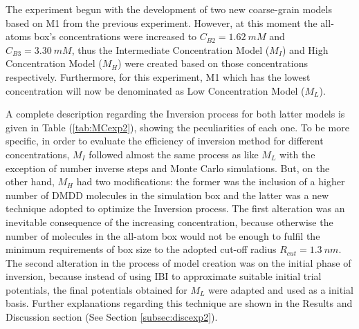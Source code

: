 \documentclass[10pt,a4paper,twoside]{article}
\begin{document}
 The experiment begun with the development of two new coarse-grain models based on M1 from the previous experiment. However, at this moment the all-atoms box's concentrations were increased to $C_{B2} = 1.62\ mM$ and $C_{B3} = 3.30\ mM$, thus the Intermediate Concentration Model ($M_{I}$) and High Concentration Model ($M_{H}$) were created based on those concentrations respectively. Furthermore, for this experiment, M1 which has the lowest concentration will now be denominated as Low Concentration Model ($M_{L}$).
 
  A complete description regarding the Inversion process for both latter models is given in Table (\ref{tab:MCexp2}), showing the peculiarities of each one. To be more specific, in order to evaluate the efficiency of inversion method for different concentrations, $M_{I}$ followed almost the same process as like $M_{L}$ with the exception of number inverse steps and Monte Carlo simulations. But, on the other hand, $M_{H}$ had two modifications: the former was the inclusion of a higher number of DMDD molecules in the simulation box and the latter was a new technique adopted to optimize the Inversion process. The first alteration was an inevitable consequence of the increasing  concentration, because otherwise the number of molecules in the all-atom box would not be enough to fulfil the minimum requirements of box size to the adopted cut-off radius $R_{cut} = 1.3 \ nm$. The second alteration in the process of model creation was on the initial phase of inversion, because instead of using IBI to approximate suitable initial trial potentials, the final potentials obtained for $M_{L}$ were adapted and used as a initial basis. Further explanations regarding this technique are shown in  the Results and Discussion section (See Section \ref{subsec:discexp2}).
\end{document}
